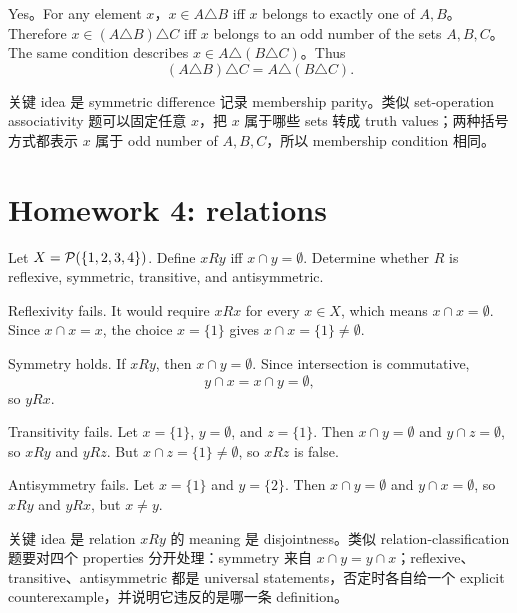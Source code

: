 \begin{solution}
Yes。For any element \(x\)，\(x\in A\triangle B\) iff \(x\) belongs to exactly one of \(A,B\)。Therefore \(x\in(A\triangle B)\triangle C\) iff \(x\) belongs to an odd number of the sets \(A,B,C\)。The same condition describes \(x\in A\triangle(B\triangle C)\)。Thus
\[
(A\triangle B)\triangle C=A\triangle(B\triangle C).
\]
\end{solution}

\begin{explanation}
关键 idea 是 symmetric difference 记录 membership parity。类似 set-operation associativity 题可以固定任意 \(x\)，把 \(x\) 属于哪些 sets 转成 truth values；两种括号方式都表示 \(x\) 属于 odd number of \(A,B,C\)，所以 membership condition 相同。
\end{explanation}

\section{Homework 4: relations}

\begin{exerciseblock}
Let \(X=\mathcal{P}(\{1,2,3,4\})\). Define \(xRy\) iff \(x\cap y=\emptyset\). Determine whether \(R\) is reflexive, symmetric, transitive, and antisymmetric.
\end{exerciseblock}

\begin{solution}
Reflexivity fails. It would require \(xRx\) for every \(x\in X\), which means \(x\cap x=\emptyset\). Since \(x\cap x=x\), the choice \(x=\{1\}\) gives \(x\cap x=\{1\}\neq\emptyset\).

Symmetry holds. If \(xRy\), then \(x\cap y=\emptyset\). Since intersection is commutative,
\[
y\cap x=x\cap y=\emptyset,
\]
so \(yRx\).

Transitivity fails. Let \(x=\{1\}\), \(y=\emptyset\), and \(z=\{1\}\). Then \(x\cap y=\emptyset\) and \(y\cap z=\emptyset\), so \(xRy\) and \(yRz\). But \(x\cap z=\{1\}\neq\emptyset\), so \(xRz\) is false.

Antisymmetry fails. Let \(x=\{1\}\) and \(y=\{2\}\). Then \(x\cap y=\emptyset\) and \(y\cap x=\emptyset\), so \(xRy\) and \(yRx\), but \(x\neq y\).
\end{solution}

\begin{explanation}
关键 idea 是 relation \(xRy\) 的 meaning 是 disjointness。类似 relation-classification 题要对四个 properties 分开处理：symmetry 来自 \(x\cap y=y\cap x\)；reflexive、transitive、antisymmetric 都是 universal statements，否定时各自给一个 explicit counterexample，并说明它违反的是哪一条 definition。
\end{explanation}

